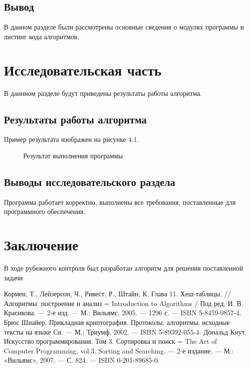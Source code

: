 \documentclass[12pt]{report}
\begin{document}
\section*{Вывод}
В данном разделе были рассмотрены основные сведения о модулях программы и листинг кода алгоритмов.

\chapter{Исследовательская часть}
В даннном разделе будут приведены результаты работы алгоритма.

\section{Результаты работы алгоритма}
Пример результата изображен на рисунке 4.1. 

\begin{figure}[ht!]
\caption{Результат выполнения программы}
\end{figure}

\section{Выводы исследовательского раздела}
Программа работает корректно, выполнены все требования, поставленные для программного обеспечения.

\chapter*{Заключение}
В ходе рубежного контроля был разработан алгоритм для решения поставленной задачи

\begin{thebibliography}{3}
	 Кормен, Т., Лейзерсон, Ч., Ривест, Р., Штайн, К. Глава 11. Хеш-таблицы. // Алгоритмы: построение и анализ = Introduction to Algorithms / Под ред. И. В. Красикова. — 2-е изд. — М.: Вильямс, 2005. — 1296 с. — ISBN 5-8459-0857-4.
	 Брюс Шнайер. Прикладная криптография. Протоколы, алгоритмы, исходные тексты на языке Си. — М.: Триумф, 2002. — ISBN 5-89392-055-4.
	 Дональд Кнут. Искусство программирования. Том 3. Сортировка и поиск = The Art of Computer Programming, vol.3. Sorting and Searching. — 2-е издание. — М.: «Вильямс», 2007. — С. 824. — ISBN 0-201-89685-0.
\end{thebibliography}
\end{document}
